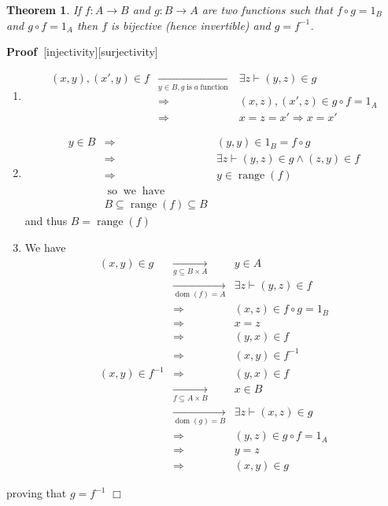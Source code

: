 \documentclass{book}
\newcommand{\Rightarrowlim}{\mathop{\rightarrow}\limits}
\newcommand{\tmop}[1]{\ensuremath{\operatorname{#1}}}
\newenvironment{proof}{\noindent\textbf{Proof\ }}{\hspace*{\fill}$\Box$\medskip}
\newtheorem{theorem}{Theorem}
\begin{document}
{{\begin{theorem}
  \label{characterization of a bijective mapping}If $f : A \rightarrow B$ and
  $g : B \rightarrow A$ are two functions such that $f \circ g = 1_B$ and $g
  \circ f = 1_A$ then $f$ is bijective (hence invertible) and $g = f^{- 1}$.
\end{theorem}

\begin{proof}[injectivity][surjectivity]
  
  \begin{enumerate}
    \item
    \begin{eqnarray*}
      (x, y), (x', y) \in f & \Rightarrowlim_{y \in B, g \tmop{is} a
      \tmop{function}} & \exists z \vdash (y, z) \in g\\
      & \Rightarrow & (x, z), (x', z) \in g \circ f = 1_A\\
      & \Rightarrow & x = z = x' \Rightarrow x = x'
    \end{eqnarray*}
    \item
    \begin{eqnarray*}
      y \in B & \Rightarrow & (y, y) \in 1_B = f \circ g\\
      & \Rightarrow & \exists z \vdash (y, z) \in g \wedge (z, y) \in f\\
      & \Rightarrow & y \in \tmop{range} (f)\\
      & \tmop{so} \tmop{we} \tmop{have} & \\
      & B \subseteq \tmop{range} (f) \subseteq B & 
    \end{eqnarray*}
    and thus $B = \tmop{range} (f)$
    
    \item We have
    \begin{eqnarray*}
      (x, y) \in g & \Rightarrowlim_{g \subseteq B \times A} & y \in A\\
      & \Rightarrowlim_{\tmop{dom} (f) = A} & \exists z \vdash (y, z) \in f\\
      & \Rightarrow & (x, z) \in f \circ g = 1_B\\
      & \Rightarrow & x = z\\
      & \Rightarrow & (y, x) \in f\\
      & \Rightarrow & (x, y) \in f^{- 1}\\
      (x, y) \in f^{- 1} & \Rightarrow & (y, x) \in f\\
      & \Rightarrowlim_{f \subseteq A \times B} & x \in B\\
      & \Rightarrowlim_{\tmop{dom} (g) = B} & \exists z \vdash (x, z) \in g\\
      & \Rightarrow & (y, z) \in g \circ f = 1_A\\
      & \Rightarrow & y = z\\
      & \Rightarrow & (x, y) \in g
    \end{eqnarray*}
  \end{enumerate}
  proving that $g = f^{- 1}$
\end{proof}

}}
\end{document}
